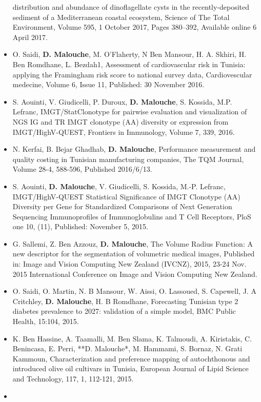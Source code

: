 \documentclass[]{article}
\begin{document}
\begin{itemize}
  distribution and abundance of dinoflagellate cysts in the
  recently-deposited sediment of a Mediterranean coastal ecosystem,
  Science of The Total Environment, Volume 595, 1 October 2017, Pages
  380--392, Available online 6 April 2017.
\item
  O. Saidi, \textbf{D. Malouche}, M. O'Flaherty, N Ben Mansour, H. A.
  Skhiri, H. Ben Romdhane, L. Bezdah1, Assessment of cardiovascular risk
  in Tunisia: applying the Framingham risk score to national survey
  data, Cardiovescular medecine, Volume 6, Issue 11, Published: 30
  November 2016.
\item
  S. Aouinti, V. Giudicelli, P. Duroux, \textbf{D. Malouche}, S.
  Kossida, M.P. Lefranc, IMGT/StatClonotype for pairwise evaluation and
  visualization of NGS IG and TR IMGT clonotype (AA) diversity or
  expression from IMGT/HighV-QUEST, Frontiers in Immunology, Volume 7,
  339, 2016.
\item
  N. Kerfai, B. Bejar Ghadhab, \textbf{D. Malouche}, Performance
  measurement and quality costing in Tunisian manufacturing companies,
  The TQM Journal, Volume 28-4, 588-596, Published 2016/6/13.
\item
  S. Aouinti, \textbf{D. Malouche}, V. Giudicelli, S. Kossida, M.-P.
  Lefranc, IMGT/HighV-QUEST Statistical Significance of IMGT Clonotype
  (AA) Diversity per Gene for Standardized Comparisons of Next
  Generation Sequencing Immunoprofiles of Immunoglobulins and T Cell
  Receptors, PloS one 10, (11), Published: November 5, 2015.
\item
  G. Sallemi, Z. Ben Azzouz, \textbf{D. Malouche}, The Volume Radius
  Function: A new descriptor for the segmentation of volumetric medical
  images, Published in: Image and Vision Computing New Zealand (IVCNZ),
  2015, 23-24 Nov. 2015 International Conference on Image and Vision
  Computing New Zealand.
\item
  O. Saidi, O. Martin, N. B Mansour, W. Aissi, O. Lassoued, S. Capewell,
  J. A Critchley, \textbf{D. Malouche}, H. B Romdhane, Forecasting
  Tunisian type 2 diabetes prevalence to 2027: validation of a simple
  model, BMC Public Health, 15:104, 2015.
\item
  K. Ben Hassine, A. Taamalli, M. Ben Slama, K. Talmoudi, A. Kiristakis,
  C. Benincasa, E. Perri, **D. Malouche*, M. Hammami, S. Bornaz, N.
  Grati Kammoun, Characterization and preference mapping of
  autochthonous and introduced olive oil cultivars in Tunisia, European
  Journal of Lipid Science and Technology, 117, 1, 112-121, 2015.
\item

\end{itemize}
\end{document}
